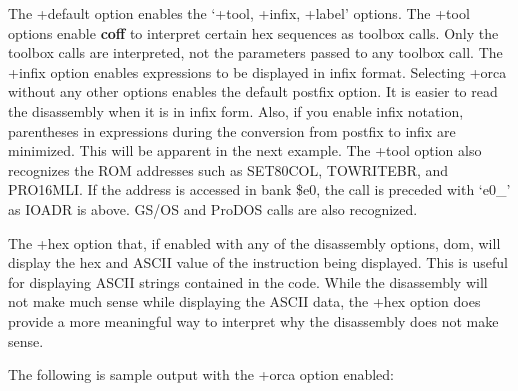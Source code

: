 \description
The +default option enables the `+tool, +infix, +label' options. The +tool
options enable {\bf coff} to interpret certain hex sequences as toolbox
calls. Only the toolbox calls are interpreted, not the parameters passed to
any toolbox call. The +infix option enables expressions to be displayed in
infix format. Selecting +orca without any other options enables the default
postfix option. It is easier to read the disassembly when it is in infix
form. Also, if you enable infix notation, parentheses in expressions during
the conversion from postfix to infix are minimized. This will be apparent
in the next example. The +tool option also recognizes the ROM addresses such
as SET80COL, TOWRITEBR, and PRO16MLI. If the address is accessed in bank
\$e0, the call is preceded with `e0\_' as IOADR is above. GS/OS and ProDOS
calls are also recognized.

\description
The +hex option that, if enabled with any of the disassembly options,
dom, will display the hex and ASCII value of the instruction being
displayed. This is useful for displaying ASCII strings contained in the
code. While the disassembly will not make much sense while displaying the
ASCII data, the +hex option does provide a more meaningful way to interpret
why the disassembly does not make sense.

\vfill\eject

\description
The following is sample output with the +orca option enabled:

